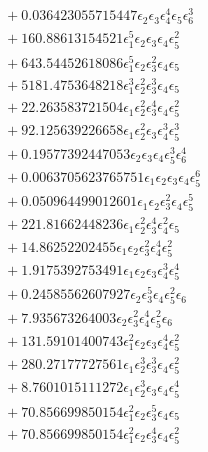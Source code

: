 \documentclass[10pt]{article}
\begin{document}
\begin{align*}
&{}  + 0.036423055715447 \epsilon_{2} \epsilon_{3} \epsilon_{4}^{4} \epsilon_{5} \epsilon_{6}^{3} \\
&{}  + 160.88613154521 \epsilon_{1}^{5} \epsilon_{2} \epsilon_{3} \epsilon_{4} \epsilon_{5}^{2} \\
&{}  + 643.54452618086 \epsilon_{1}^{5} \epsilon_{2} \epsilon_{3}^{2} \epsilon_{4} \epsilon_{5} \\
&{}  + 5181.4753648218 \epsilon_{1}^{3} \epsilon_{2}^{2} \epsilon_{3}^{3} \epsilon_{4} \epsilon_{5} \\
&{}  + 22.263583721504 \epsilon_{1} \epsilon_{2}^{2} \epsilon_{3}^{4} \epsilon_{4} \epsilon_{5}^{2} \\
&{}  + 92.125639226658 \epsilon_{1} \epsilon_{2}^{2} \epsilon_{3} \epsilon_{4}^{3} \epsilon_{5}^{3} \\
&{}  + 0.19577392447053 \epsilon_{2} \epsilon_{3} \epsilon_{4} \epsilon_{5}^{3} \epsilon_{6}^{4} \\
&{}  + 0.0063705623765751 \epsilon_{1} \epsilon_{2} \epsilon_{3} \epsilon_{4} \epsilon_{5}^{6} \\
&{}  + 0.050964499012601 \epsilon_{1} \epsilon_{2} \epsilon_{3}^{2} \epsilon_{4} \epsilon_{5}^{5} \\
&{}  + 221.81662448236 \epsilon_{1} \epsilon_{2}^{2} \epsilon_{3}^{4} \epsilon_{4}^{2} \epsilon_{5} \\
&{}  + 14.86252202455 \epsilon_{1} \epsilon_{2} \epsilon_{3}^{2} \epsilon_{4}^{4} \epsilon_{5}^{2} \\
&{}  + 1.9175392753491 \epsilon_{1} \epsilon_{2} \epsilon_{3} \epsilon_{4}^{3} \epsilon_{5}^{4} \\
&{}  + 0.24585562607927 \epsilon_{2} \epsilon_{3}^{5} \epsilon_{4} \epsilon_{5}^{2} \epsilon_{6} \\
&{}  + 7.935673264003 \epsilon_{2} \epsilon_{3}^{2} \epsilon_{4}^{4} \epsilon_{5}^{2} \epsilon_{6} \\
&{}  + 131.59101400743 \epsilon_{1}^{2} \epsilon_{2} \epsilon_{3} \epsilon_{4}^{4} \epsilon_{5}^{2} \\
&{}  + 280.27177727561 \epsilon_{1} \epsilon_{2}^{3} \epsilon_{3}^{3} \epsilon_{4} \epsilon_{5}^{2} \\
&{}  + 8.7601015111272 \epsilon_{1} \epsilon_{2}^{3} \epsilon_{3} \epsilon_{4} \epsilon_{5}^{4} \\
&{}  + 70.856699850154 \epsilon_{1}^{2} \epsilon_{2} \epsilon_{3}^{5} \epsilon_{4} \epsilon_{5} \\
&{}  + 70.856699850154 \epsilon_{1}^{2} \epsilon_{2} \epsilon_{3}^{4} \epsilon_{4} \epsilon_{5}^{2} \\

\end{align*}
\end{document}
